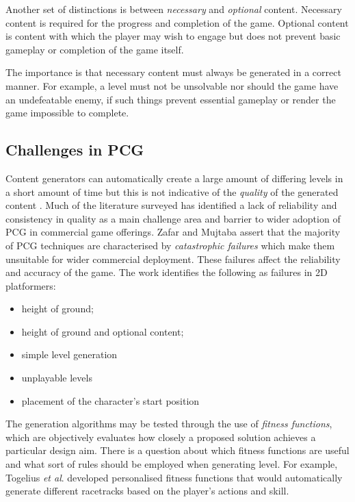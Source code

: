 \documentclass[11pt, a4paper, oneside]{report} %
\begin{document}
Another set of distinctions is between \textit{necessary} and \textit{optional}
content. Necessary content is required for the progress and completion of the
game. Optional content is content with which the player may wish to engage but
does not prevent basic gameplay or completion of the game itself.

The importance is that necessary content must always be generated in a correct
manner. For example, a level must not be unsolvable nor should the game have an
undefeatable enemy, if such things prevent essential gameplay or render the game
impossible to complete.

\subsection{Challenges in PCG}

Content generators can automatically create a large amount of differing levels
in a short amount of time but this is not indicative of the \textit{quality} of
the generated content \cite{Smith:2009:RLG:1536513.1536548}. Much of the
literature surveyed has identified a lack of reliability and consistency in
quality as a main challenge area and barrier to wider adoption of PCG in
commercial game offerings. Zafar and Mujtaba \cite{6424299} assert that the
majority of PCG techniques are characterised by \textit{catastrophic failures}
which make them unsuitable for wider commercial deployment. These failures
affect the reliability and accuracy of the game. The work identifies the
following as failures in 2D platformers:

\begin{itemize}

  \item height of ground;
  \item height of ground and optional content;
  \item simple level generation
  \item unplayable levels
  \item placement of the character's start position

\end{itemize}

The generation algorithms may be tested through the use of \textit{fitness
functions}, which are objectively evaluates how closely a proposed solution
achieves a particular design aim. There is a question about which fitness
functions are useful and what sort of rules should be employed when generating
level. For example, Togelius \textit{et al}. \cite{togelius2007towards}
developed personalised fitness functions that would automatically generate
different racetracks based on the player's actions and skill.
\end{document}
